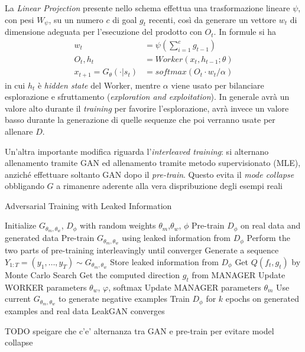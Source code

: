 La \emph{Linear Projection} presente nello schema effettua una trasformazione lineare $\psi$, con pesi $W_\psi$, su un numero $c$ di goal $g_t$ recenti, così da generare un vettore $w_t$ di dimensione adeguata per l'esecuzione del prodotto con $O_t$.
In formule si ha
\begin{align}
  w_t &= \psi \left( \sum_{i=1}^{c} g_{t-1} \right)
  \\
  O_t, h_t &= Worker(x_t, h_{t-1}; \theta)
  \\
  x_{t+1} = G_\theta(\cdot|s_t) &= softmax ( O_t \cdot w_t / \alpha)
\end{align}
in cui $h_t$ è \emph{hidden state} del Worker, mentre $\alpha$ viene usato per bilanciare esplorazione e sfruttamento (\emph{exploration and exploitation}).
In generale avrà un valore alto durante il \emph{training} per favorire l'esplorazione, avrà invece un valore basso durante la generazione di quelle sequenze che poi verranno usate per allenare $D$.



Un'altra importante modifica riguarda l'\emph{interleaved training}: si alternano allenamento tramite GAN ed allenamento tramite metodo supervisionato (MLE), anziché effettuare soltanto GAN dopo il \emph{pre-train}.
Questo evita il \emph{mode collapse} obbligando $G$ a rimanenre aderente alla vera dispribuzione degli esempi reali 


\begin{algorithm}
  \caption{Adversarial Training with Leaked Information}
  \label{alg:LeakGAN}
  \begin{algorithmic}[1]
    \State Initialize $G_{\theta_m, \theta_w}$, $D_\phi$ with random weights $\theta_m$,$\theta_w$, $\phi$
    \State Pre-train $D_\phi$ on real data and generated data
    \State Pre-train $G_{\theta_m, \theta_w}$ using leaked information from $D_\phi$
    \State Perform the two parts of pre-training interleavingly until converger
    \Repeat
        \State Generate a sequence $Y_{1:T} = (y_1, \dots, y_T) \sim G_{\theta_m, \theta_w}$
          \State Store leaked information from $D_\phi$
          \State Get $Q(f_t, g_t)$ by Monte Carlo Search
          \State Get the computed direction $g_t$ from MANAGER
          \State Update WORKER parameters $\theta_w$, $\varphi$, softmax
          \State Update MANAGER parameters $\theta_m$
        \EndFor
      \EndFor
        \State Use current $G_{\theta_m, \theta_w}$ to generate negative examples
        \State Train $D_\phi$ for $k$ epochs on generated examples and real data
      \EndFor
    \Until \State LeakGAN converges
  \end{algorithmic}
\end{algorithm}

TODO speigare che c'e' alternanza tra GAN e pre-train per evitare model collapse
